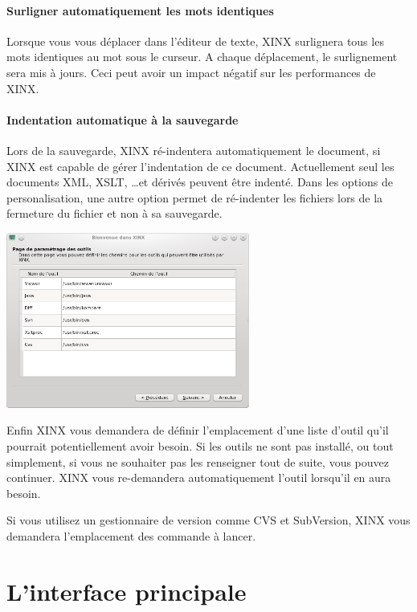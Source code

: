 \documentclass[a4paper,10pt,twoside]{book}
\begin{document}
\paragraph{Surligner automatiquement les mots identiques} Lorsque vous vous déplacer dans l'éditeur de texte, XINX surlignera tous les mots identiques au mot sous le curseur. A chaque déplacement, le surlignement sera mis à jours. Ceci peut avoir un impact négatif sur les performances de XINX.

\paragraph{Indentation automatique à la sauvegarde} Lors de la sauvegarde, XINX ré-indentera automatiquement le document, si XINX est capable de gérer l'indentation de ce document. Actuellement seul les documents XML, XSLT, \dots et dérivés peuvent être indenté. Dans les options de personalisation, une autre option permet de ré-indenter les fichiers lors de la fermeture du fichier et non à sa sauvegarde.

\begin{center}
 \includegraphics[width=0.60\textwidth]{./firstinstall4.png}
\end{center}

Enfin XINX vous demandera de définir l'emplacement d'une liste d'outil qu'il pourrait potentiellement avoir besoin. Si les outils ne sont pas installé, ou tout simplement, si vous ne souhaiter pas les renseigner tout de suite, vous pouvez continuer. XINX vous re-demandera automatiquement l'outil lorsqu'il en aura besoin.

Si vous utilisez un gestionnaire de version comme CVS et SubVersion, XINX vous demandera l'emplacement des commande à lancer.

\section{L'interface principale}
\end{document}
